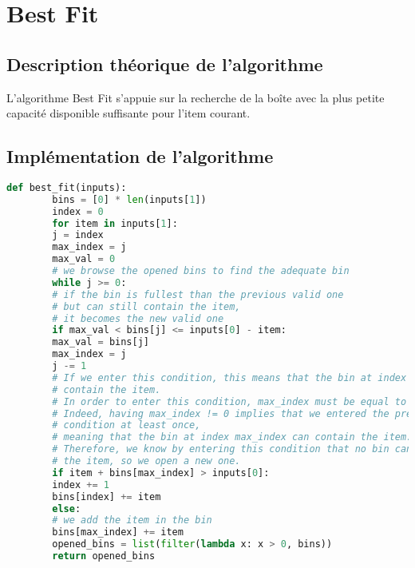 \documentclass{article}
\begin{document}


    \section{Best Fit}
    \subsection{Description théorique de l'algorithme}
    L'algorithme Best Fit s'appuie sur la recherche de la boîte avec la plus petite capacité disponible suffisante pour l'item courant.

    \subsection{Implémentation de l'algorithme}
    \begin{lstlisting}[language=Python, frame=single]
        def best_fit(inputs):
        bins = [0] * len(inputs[1])
        index = 0
        for item in inputs[1]:
        j = index
        max_index = j
        max_val = 0
        # we browse the opened bins to find the adequate bin
        while j >= 0:
        # if the bin is fullest than the previous valid one
        # but can still contain the item,
        # it becomes the new valid one
        if max_val < bins[j] <= inputs[0] - item:
        max_val = bins[j]
        max_index = j
        j -= 1
        # If we enter this condition, this means that the bin at index max_index cannot
        # contain the item.
        # In order to enter this condition, max_index must be equal to 0.
        # Indeed, having max_index != 0 implies that we entered the precedent if
        # condition at least once,
        # meaning that the bin at index max_index can contain the item.
        # Therefore, we know by entering this condition that no bin can contain
        # the item, so we open a new one.
        if item + bins[max_index] > inputs[0]:
        index += 1
        bins[index] += item
        else:
        # we add the item in the bin
        bins[max_index] += item
        opened_bins = list(filter(lambda x: x > 0, bins))
        return opened_bins
    \end{lstlisting}
\end{document}
